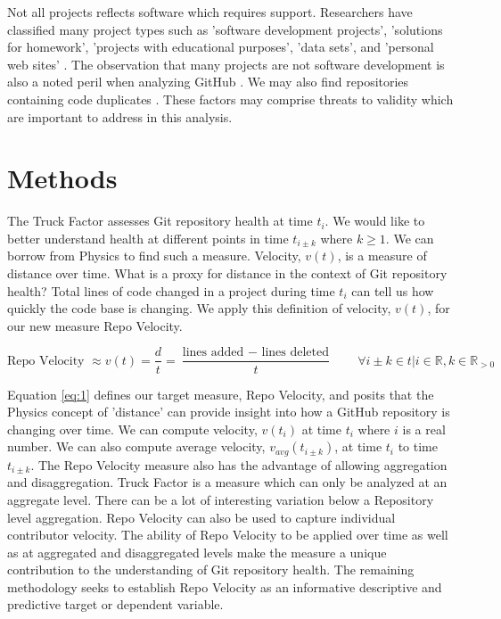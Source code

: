\documentclass{article}
\begin{document}
Not all projects reflects software which requires support. Researchers have
classified many project types such as 'software development projects',
'solutions for homework', 'projects with educational purposes', 'data sets',
and 'personal web sites' \cite{soll2017classifyhub}. The observation that
many projects are not software development is also a noted peril when
analyzing GitHub \cite{kalliamvakou2016depth}. We may also find repositories
containing code duplicates \cite{lopes2017dejavu}. These factors may
comprise threats to validity which are important to address in this analysis.

\section{Methods}

The Truck Factor assesses Git repository health at time $t_i$. We would
like to better understand health at different points in time $t_{i \pm k}$
where $k \ge 1$. We can borrow from Physics to find such a measure. Velocity,
$v(t)$, is a measure of distance over time. What is a proxy for distance in
the context of Git repository health? Total lines of code changed in a
project during time $t_i$ can tell us how quickly the code base is
changing. We apply this definition of velocity, $v(t)$, for our new measure
Repo Velocity.

\begin{equation} \label{eq:1}
  \text{Repo Velocity } \approx v(t) = \frac{d}{t} =
  \frac{\text{lines added } - \text{ lines deleted}}{t}
  \qquad \forall i \pm k \in t | i \in \mathbb{R}, k \in \mathbb{R}_{>0}
\end{equation}

Equation \ref{eq:1} defines our target measure, Repo Velocity, and posits
that the Physics concept of 'distance' can provide insight into how a GitHub
repository is changing over time. We can compute velocity, $v(t_i)$ at time
$t_i$ where $i$ is a real number. We can also compute average velocity,
$v_{avg}(t_{i \pm k})$, at time $t_i$ to time $t_{i \pm k}$. The Repo
Velocity measure also has the advantage of allowing aggregation and
disaggregation. Truck Factor is a measure which can only be analyzed at an
aggregate level. There can be a lot of interesting variation below a
Repository level aggregation. Repo Velocity can also be used to capture
individual contributor velocity. The ability of Repo Velocity to be applied
over time as well as at aggregated and disaggregated levels make the measure
a unique contribution to the understanding of Git repository health. The
remaining methodology seeks to establish Repo Velocity as an informative
descriptive and predictive target or dependent variable.
\end{document}
